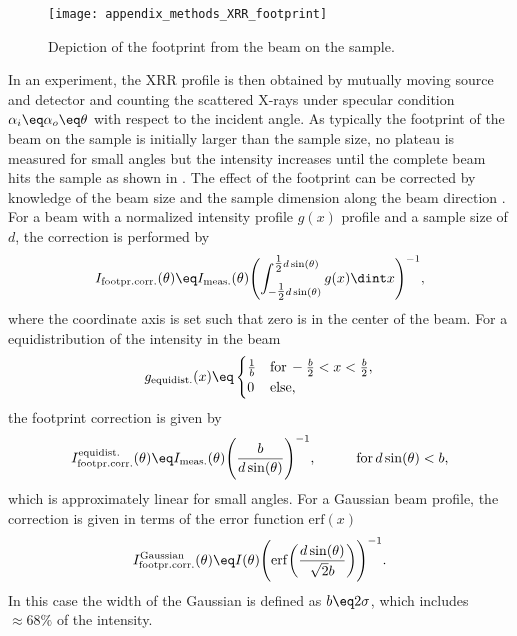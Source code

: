 \documentclass[\main/dresen_thesis.tex]{subfiles}
\begin{document}
    \begin{figure}[tb]
      \centering
      \texttt{[image: appendix\_methods\_XRR\_footprint]}
      \caption{\label{fig:methods:xrr:footprint}Depiction of the footprint from the beam on the sample.}
    \end{figure}

    In an experiment, the XRR profile is then obtained by mutually moving source and detector and counting the scattered X-rays under specular condition $\alpha_i \eq \alpha_o \eq \theta$ with respect to the incident angle.
    As typically the footprint of the beam on the sample is initially larger than the sample size, no plateau is measured for small angles but the intensity increases until the complete beam hits the sample as shown in .
    The effect of the footprint can be corrected by knowledge of the beam size and the sample dimension along the beam direction \cite{Gibaud_1993_Theco}.
    For a beam with a normalized intensity profile $g(x)$ profile and a sample size of $d$, the correction is performed by
    \begin{align}
      I_\mathrm{footpr. corr.}(\theta) \eq I_\mathrm{meas.}(\theta) \Biggl( \int_{-\tfrac{1}{2}d \sin(\theta)}^{\tfrac{1}{2}d \sin(\theta)} g(x) \dint x \Biggr)^{-1},
    \end{align}
    where the coordinate axis is set such that zero is in the center of the beam.
    For a equidistribution of the intensity in the beam
    \begin{align}
      g_\mathrm{equidist.}(x) \eq \begin{cases}
        \frac{1}{b}& \mathrm{for\,}-\frac{b}{2} < x < \frac{b}{2},\\
        0&\mathrm{else},
      \end{cases}
    \end{align}
    the footprint correction is given by
    \begin{align}
      I_\mathrm{footpr. corr.}^\mathrm{equidist.}(\theta) \eq I_\mathrm{meas.}(\theta) \Biggl( \frac{b}{d \sin(\theta)}\Biggr)^{-1},\hspace{1cm}\mathrm{for\,}d\sin(\theta)<b ,
    \end{align}
    which is approximately linear for small angles.
    For a Gaussian beam profile, the correction is given in terms of the error function $\mathrm{erf}(x)$
    \begin{align}
      I_\mathrm{footpr. corr.}^\mathrm{Gaussian}(\theta) \eq I(\theta) \Biggl( \mathrm{erf}\biggl( \frac{d \sin(\theta)}{\sqrt{2}b} \biggr) \Biggr)^{-1}.
    \end{align}
    In this case the width of the Gaussian is defined as $b \eq 2 \sigma$, which includes $\approx 68 \%$ of the intensity.
\end{document}
